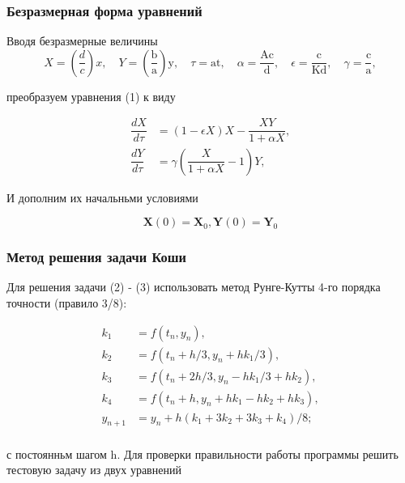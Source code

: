 \documentclass[a4paper,14pt]{extreport}
\begin{document}
\subsubsection{Безразмерная форма уравнений} 
\hspace{0.8cm} Вводя безразмерные величины
$$
X=\left(\dfrac {d}{c}\right) x, \quad Y=\left(\dfrac{\mathrm{b}}{\mathrm{a}}\right) \mathrm{y}, \quad \tau=\mathrm{at}, \quad \alpha=\dfrac{\mathrm{Ac}}{\mathrm{d}}, \quad \epsilon=\dfrac{\mathrm{c}}{\mathrm{Kd}}, \quad \gamma=\dfrac{\mathrm{c}}{\mathrm{a}},
$$

преобразуем уравнения (1) к виду

\begin{equation}
    \begin{aligned}
        \dfrac{d X}{d \tau} &= (1-\epsilon X) X-\dfrac{X Y}{1+\alpha X}, \\
        \dfrac{d Y}{d \tau} &= \gamma \left(\dfrac{X}{1+\alpha X} - 1\right) Y, 
    \end{aligned}
\end{equation}

И дополним их начальньми условиями

\begin{equation}
\mathbf{X}(0)=\mathbf{X}_0, \mathbf{Y}(0)=\mathbf{Y}_0
\end{equation}

\subsubsection{Метод решения задачи Коши} 
\hspace{0.8cm}Для решения задачи (2) - (3) использовать метод Рунге-Кутты 4-го порядка точности (правило 3/8):


\begin{equation}
\begin{aligned}
k_1&=f\left(t_n, y_n\right), \\
k_2&=f\left(t_n+h / 3, y_n+h k_1 / 3\right), \\
k_3&=f\left(t_n+2 h / 3, y_n-h k_1 / 3+h k_2\right), \\
k_4&=f\left(t_n+h, y_n+h k_1-h k_2+h k_3\right), \\
y_{n+1}&=y_n+h\left(k_1+3 k_2+3 k_3+k_4\right) / 8;\\
\end{aligned}
\end{equation}

с постоянньм шагом $\mathrm{h}$. Для проверки правильности работы программы решить тестовую задачу из двух уравнений
\end{document}

